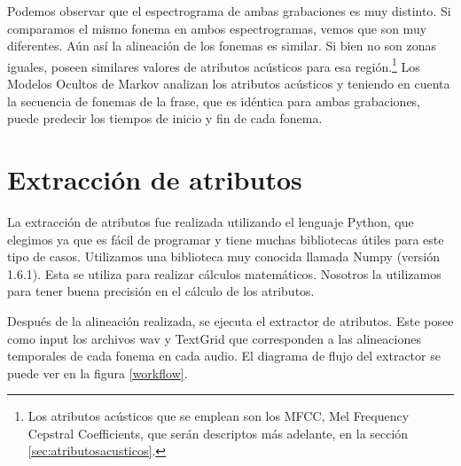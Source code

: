 Podemos observar que el espectrograma de ambas grabaciones es muy distinto. Si comparamos el mismo fonema en ambos espectrogramas, vemos que son muy diferentes. Aún así la alineación de los fonemas es similar. Si bien no son zonas iguales, poseen similares valores de atributos acústicos para esa región.\footnote{Los atributos acústicos que se emplean son los MFCC, Mel Frequency Cepstral Coefficients, que serán descriptos más adelante, en la sección \ref{sec:atributosacusticos}.} Los Modelos Ocultos de Markov analizan los atributos acústicos y teniendo en cuenta la secuencia de fonemas de la frase, que es idéntica para ambas grabaciones, puede predecir los tiempos de inicio y fin de cada fonema.



\section{Extracción de atributos}

La extracción de atributos fue realizada utilizando el lenguaje Python, que elegimos ya que es fácil de programar y tiene muchas bibliotecas útiles para este tipo de casos. Utilizamos una biblioteca muy conocida llamada Numpy (versión 1.6.1). Esta se utiliza para realizar cálculos matemáticos. Nosotros la utilizamos para tener buena precisión en el cálculo de los atributos.

Después de la alineación realizada, se ejecuta el extractor de atributos. Este posee como input los archivos wav y TextGrid que corresponden a las alineaciones temporales de cada fonema en cada audio. El diagrama de flujo del extractor se puede ver en la figura \ref{workflow}. 

